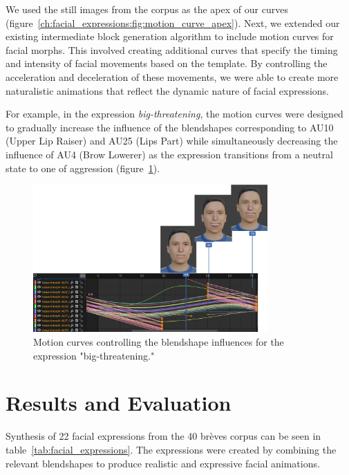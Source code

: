 \documentclass[../../main]{subfiles}
\begin{document}
We used the still images from the corpus as the apex of our curves (figure~\ref{ch:facial_expressions:fig:motion_curve_apex}). Next, we extended our existing intermediate block generation algorithm to include motion curves for facial morphs. This involved creating additional curves that specify the timing and intensity of facial movements based on the template. By controlling the acceleration and deceleration of these movements, we were able to create more naturalistic animations that reflect the dynamic nature of facial expressions.

For example, in the expression \emph{big-threatening}, the motion curves were designed to gradually increase the influence of the blendshapes corresponding to AU10 (Upper Lip Raiser) and AU25 (Lips Part) while simultaneously decreasing the influence of AU4 (Brow Lowerer) as the expression transitions from a neutral state to one of aggression (figure~\ref{ch:facial_expressions:fig:motion_curve_example}).

\begin{figure}[h]
    \centering
    \includegraphics[width=0.8\textwidth]{chapters/facial_expressions/images/motion_curve_example.png}
    \caption{Motion curves controlling the blendshape influences for the expression "big-threatening."}
    \label{ch:facial_expressions:fig:motion_curve_example}
\end{figure}

\section{Results and Evaluation}
\label{ch:facial_expressions:results}

Synthesis of 22 facial expressions from the 40 brèves corpus can be seen in table~\ref{tab:facial_expressions}. The expressions were created by combining the relevant blendshapes to produce realistic and expressive facial animations.
\end{document}
